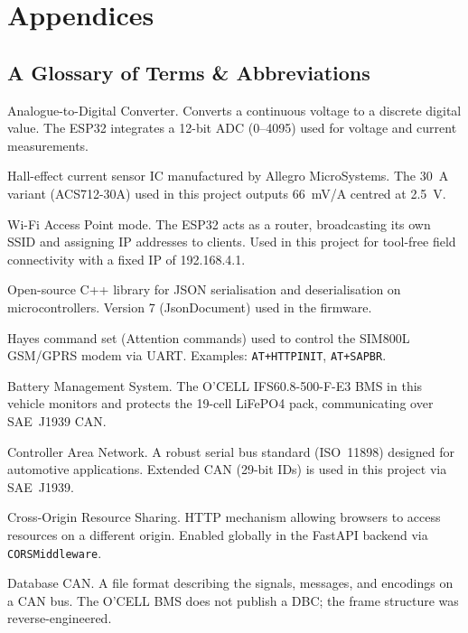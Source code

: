 \section*{Appendices}

\subsection*{A \quad Glossary of Terms \& Abbreviations}

\begin{description}[leftmargin=3.2cm, style=nextline, font=\bfseries]
  \item[ADC]        Analogue-to-Digital Converter. Converts a continuous voltage to a discrete digital value. The ESP32 integrates a 12-bit ADC (0–4095) used for voltage and current measurements.
  \item[ACS712]     Hall-effect current sensor IC manufactured by Allegro MicroSystems. The 30~A variant (ACS712-30A) used in this project outputs 66~mV/A centred at 2.5~V.
  \item[AP Mode]    Wi-Fi Access Point mode. The ESP32 acts as a router, broadcasting its own SSID and assigning IP addresses to clients. Used in this project for tool-free field connectivity with a fixed IP of 192.168.4.1.
  \item[ArduinoJson] Open-source C++ library for JSON serialisation and deserialisation on microcontrollers. Version 7 (JsonDocument) used in the firmware.
  \item[AT Commands] Hayes command set (Attention commands) used to control the SIM800L GSM/GPRS modem via UART. Examples: \texttt{AT+HTTPINIT}, \texttt{AT+SAPBR}.
  \item[BMS]        Battery Management System. The O'CELL IFS60.8-500-F-E3 BMS in this vehicle monitors and protects the 19-cell LiFePO4 pack, communicating over SAE~J1939 CAN.
  \item[CAN]        Controller Area Network. A robust serial bus standard (ISO~11898) designed for automotive applications. Extended CAN (29-bit IDs) is used in this project via SAE~J1939.
  \item[CORS]       Cross-Origin Resource Sharing. HTTP mechanism allowing browsers to access resources on a different origin. Enabled globally in the FastAPI backend via \texttt{CORSMiddleware}.
  \item[DBC]        Database CAN. A file format describing the signals, messages, and encodings on a CAN bus. The O'CELL BMS does not publish a DBC; the frame structure was reverse-engineered.

\end{description}
